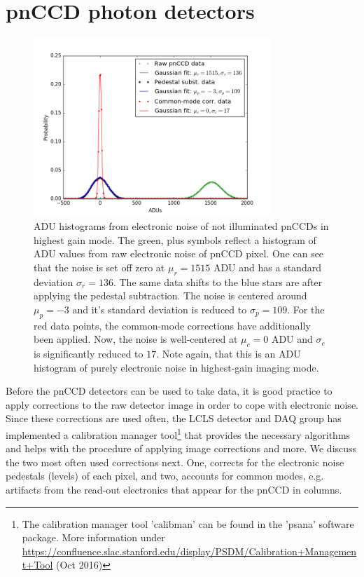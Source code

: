 \section{pnCCD photon detectors}\label{sec:pnccd-corr}
\begin{figure}
	\centering
		\includegraphics[width=0.80\textwidth]{images/pnCCD-electronic-noise.png}
	\caption[ADU histograms from electronic noise of not illuminated pnCCDs.]{ADU histograms from electronic noise of not illuminated pnCCDs in highest gain mode. The green, plus symbols reflect a histogram of ADU values from raw electronic noise of pnCCD pixel. One can see that the noise is set off zero at $\mu_{r}=1515$ ADU and has a standard deviation $\sigma_{r}=136$. The same data shifts to the blue stars are after applying the pedestal subtraction. The noise is centered around $\mu_{p}=-3$ and it's standard deviation is reduced to $\sigma_{p}=109$. For the red  data points, the common-mode corrections have additionally been applied. Now, the noise is well-centered at $\mu_{c}=0$ ADU and $\sigma_{c}$ is significantly reduced to $17$. Note again, that this is an ADU histogram of purely electronic noise in highest-gain imaging mode.}
	\label{fig:pnCCD-electronic-noise}
\end{figure}
Before the pnCCD detectors can be used to take data, it is good practice to apply corrections to the raw detector image in order to cope with electronic noise. Since these corrections are used often, the LCLS detector and DAQ group has implemented a calibration manager tool\footnote{The calibration manager tool 'calibman' can be found in the 'psana' software package. More information under \url{https://confluence.slac.stanford.edu/display/PSDM/Calibration+Management+Tool} (Oct 2016)} that provides the necessary algorithms and helps with the procedure of applying image corrections and more. We discuss the two most often used corrections next. One, corrects for the electronic noise pedestals (levels) of each pixel, and two, accounts for common modes, e.g. artifacts from the read-out electronics that appear for the pnCCD in columns.\\
